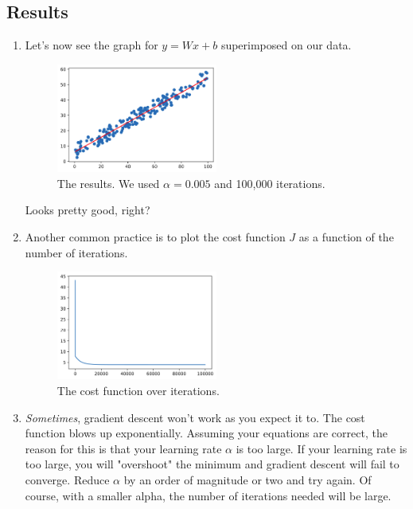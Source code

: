 \documentclass{article}
\begin{document}
        \subsection{Results}
            \begin{enumerate}
                \item Let's now see the graph for $ y = Wx + b$ superimposed on our data.
                \begin{figure}[h] \begin{center}
                    \includegraphics[width = 0.5\textwidth]{plot9.png}
                    \caption{The results. We used $\alpha = 0.005$ and 100,000 iterations.}
                \end{center} \end{figure}
                Looks pretty good, right?
                \item Another common practice is to plot the cost function $J$ as a function of the number of iterations.
                \begin{figure}[H] \begin{center}
                    \includegraphics[width = 0.5\textwidth]{plot10.png}
                    \caption{The cost function over iterations.}
                \end{center} \end{figure}
                \item \emph{Sometimes}, gradient descent won't work as you expect it to. The cost function blows up exponentially. Assuming your equations are correct,
                the reason for this is that your learning rate $\alpha$ 
                is too large. If your learning rate is too large, you will "overshoot" the minimum and gradient descent will fail to converge.
                Reduce $\alpha$ by an order of magnitude or two and try again. Of course, with a smaller alpha, the number of iterations needed will be large.
            \end{enumerate}
\end{document}

